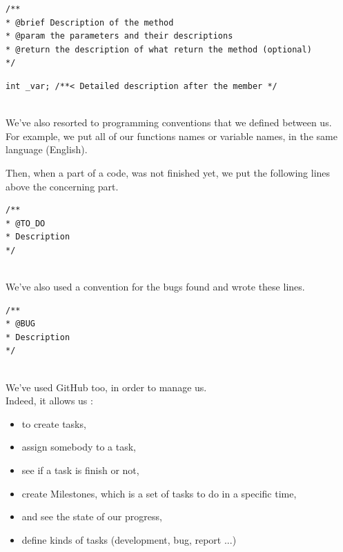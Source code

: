 \begin{lstlisting}[frame=trBL, title=Doxygen Convention for methods]
/**
* @brief Description of the method
* @param the parameters and their descriptions
* @return the description of what return the method (optional)
*/
\end{lstlisting}

\begin{lstlisting}[frame=trBL, title=Doxygen Convention for members]
int _var; /**< Detailed description after the member */
\end{lstlisting}
~\\

We've also resorted to programming conventions that we defined between us.\\
For example, we put all of our functions names or variable names, in the same language (English).\\

\newpage

Then, when a part of a code, was not finished yet, we put the following lines above the concerning part.

\begin{lstlisting}[frame=trBL, title=Programming convention for unfinished code]
/**
* @TO_DO
* Description
*/
\end{lstlisting}
~\\

We've also used a convention for the bugs found and wrote these lines.\\

\begin{lstlisting}[frame=trBL, title=Programming convention for bugs]
/**
* @BUG
* Description
*/
\end{lstlisting}
~\\

We've used GitHub too, in order to manage us.\\
Indeed, it allows us :\\

\begin{itemize}
\item to create tasks, 
\item assign somebody to a task, 
\item see if a task is finish or not,
\item create Milestones, which is a set of tasks to do in a specific time, 
\item and see the state of our progress,
\item define kinds of tasks (development, bug, report ...)
\end{itemize}
~\\

